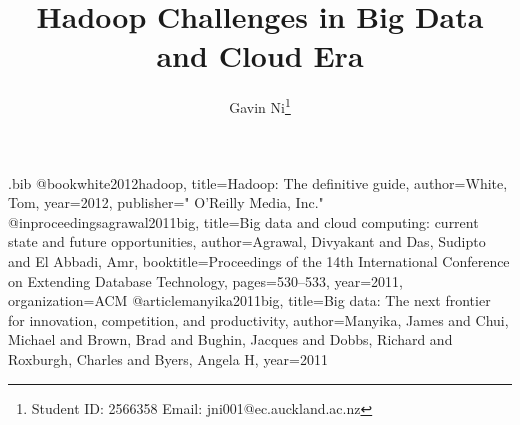\RequirePackage{filecontents}        %
\begin{filecontents*}{\jobname.bib}
@book{white2012hadoop,
  title={Hadoop: The definitive guide},
  author={White, Tom},
  year={2012},
  publisher={" O'Reilly Media, Inc."}
}
@inproceedings{agrawal2011big,
  title={Big data and cloud computing: current state and future opportunities},
  author={Agrawal, Divyakant and Das, Sudipto and El Abbadi, Amr},
  booktitle={Proceedings of the 14th International Conference on Extending Database Technology},
  pages={530--533},
  year={2011},
  organization={ACM}
}
@article{manyika2011big,
  title={Big data: The next frontier for innovation, competition, and productivity},
  author={Manyika, James and Chui, Michael and Brown, Brad and Bughin, Jacques and Dobbs, Richard and Roxburgh, Charles and Byers, Angela H},
  year={2011}
}
\end{filecontents*}

\documentclass[11pt, oneside]{article}   	%
\usepackage{geometry}                		%
\geometry{letterpaper}                   		%
\usepackage{graphicx}				%
\usepackage{apacite}							%
\usepackage{amssymb}




\title{Hadoop Challenges in Big Data and Cloud Era}
\author{Gavin Ni\thanks{Student ID: 2566358 Email: jni001@ec.auckland.ac.nz}}


